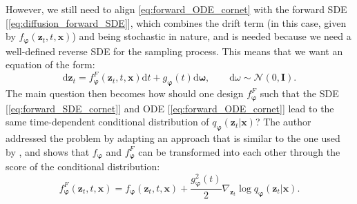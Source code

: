 However, we still need to align \cref{eq:forward_ODE_cornet} with the forward SDE [\cref{eq:diffusion_forward_SDE}], which combines the drift term (in this case, given by $f_{\boldsymbol{\varphi}}(\bm{z}_t,t,\bm{x})$) and being stochastic in nature, and is needed because we need a well-defined reverse SDE for the sampling process. This means that we want an equation of the form:
\begin{equation}
    \label{eq:forward_SDE_cornet}
    \mbox{d}\bm{z}_t=f^F_{\boldsymbol{\varphi}}(\bm{z}_t,t,\bm{x})\mbox{d}t+g_{\boldsymbol{\varphi}}(t)\mathrm{d}\boldsymbol{\omega},\qquad\mbox{d}\omega\sim\mathcal{N}(0,\bm{I}).
\end{equation}
The main question then becomes how should one design $f^F_{\boldsymbol{\varphi}}$ such that the SDE [\cref{eq:forward_SDE_cornet}] and ODE [\cref{eq:forward_ODE_cornet}] lead to the same time-dependent conditional distribution of $q_{\boldsymbol{\varphi}}(\bm{z}_t|\bm{x})$? The author addressed the problem by adapting an approach that is similar to the one used by \citet{ni2026straight}, and shows that $f_{\boldsymbol{\varphi}}$ and $f^F_{\boldsymbol{\varphi}}$ can be transformed into each other through the score of the conditional distribution:
\begin{equation*}
    f^F_{\boldsymbol{\varphi}}(\bm{z}_t,t,\bm{x})=
    f_{\boldsymbol{\varphi}}(\bm{z}_t,t,\bm{x})
    +\frac{g^2_{\boldsymbol{\varphi}}(t)}{2}\nabla_{\bm{z}_t}\log q_{\boldsymbol{\varphi}}(\bm{z}_t|\bm{x}).
\end{equation*}
